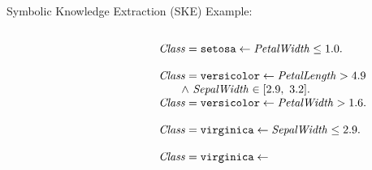 \documentclass[presentation]{beamer}\mode<presentation>{\usetheme{AMSBolognaFC}}
\begin{document}
\begin{frame}[allowframebreaks]{Symbolic Knowledge Extraction (SKE)}
    Example:
    \begin{columns}
        \begin{column}{.43\linewidth}
        \end{column}
        \begin{column}{.53\linewidth}\small
            \[ 
                \begin{array}{l}
                    \variable{Class} = \functor{setosa} \leftarrow \variable{PetalWidth} \leq 1.0 \fullstop
                    \\
                    \\
                    \variable{Class} = \functor{versicolor} \leftarrow \variable{PetalLength} > 4.9 \\ 
                        \qquad  \wedge\ \variable{SepalWidth} \in [2.9,\ 3.2] \fullstop
                    \\
                    \variable{Class} = \functor{versicolor} \leftarrow  \variable{PetalWidth} > 1.6 \fullstop
                    \\
                    \\
                    \variable{Class} = \functor{virginica} \leftarrow \variable{SepalWidth} \leq 2.9 \fullstop
                    \\
                    \\
                    \variable{Class} = \functor{virginica} \leftarrow \\ 

\end{array}\]
\end{column}
\end{columns}
\end{frame}
\end{document}
